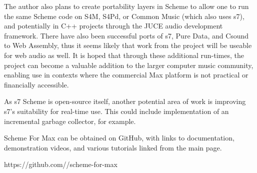 \documentclass[acmsmall, anonymous, review]{acmart}
\begin{document}
The author also plans to create portability layers in Scheme to allow one to run 
the same Scheme code on S4M, S4Pd, or Common Music (which also uses s7),
and potentially in C++ projects through the JUCE audio development framework.
There have also been successful ports of s7, Pure Data, and Csound to Web Assembly, 
thus it seems likely that work from the project will be useable for web audio as well.
It is hoped that through these additional run-times, the project can become 
a valuable addition to the larger computer music community, enabling
use in contexts where the commercial Max platform is not practical
or financially accessible.

As s7 Scheme is open-source itself, another potential area of work
is improving s7's suitability for real-time use. This could include
implementation of an incremental garbage collector, for example.

Scheme For Max can be obtained on GitHub, with links to documentation,
demonstration videos, and various tutorials linked from the main page.


https://github.com//scheme-for-max




\end{document}

